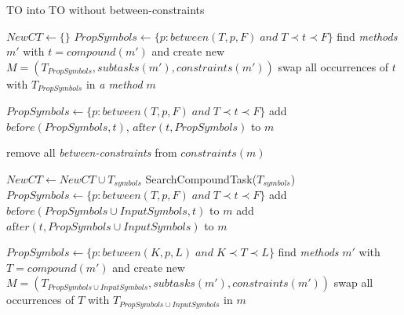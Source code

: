 \begin{algorithm}
    \caption{TO into TO without between-constraints}\label{alg04:1}
    \begin{algorithmic}[1]
            \State $NewCT \gets \{\}$ 
                    \State $PropSymbols \gets \{p: between(T, p, F) \; and \; T \prec t \prec F \}$
                        \State find \emph{methods} $m'$ with $t = compound(m')$ and create new $M=(T_{PropSymbols}, subtasks(m'), constraints(m'))$
                    \EndIf
                    \State swap all occurrences of $t$ with $T_{PropSymbols}$ in \emph{a method} $m$
                \EndFor

                    \State $PropSymbols \gets \{p: between(T, p, F) \; and \; T \prec t \prec F \}$
                    \State {}
                    \State add $be\text{f}ore(PropSymbols, t)$, $a\text{f}ter(t, PropSymbols)$ to $m$
                \EndFor
                
                \State remove all \emph{between-constraints} from $constraints(m)$

                    \State $NewCT \gets NewCT \cup T_{symbols}$
                    \State SearchCompoundTask($T_{symbols}$)
                \EndFor
            \EndWhile
        \EndProcedure
                    \State $PropSymbols \gets \{p: between(T, p, F) \; and \; T \prec t \prec F \}$
                    \State add $be\text{f}ore(PropSymbols \cup InputSymbols, t)$ to $m$
                    \State add $a\text{f}ter(t, PropSymbols \cup InputSymbols)$ to $m$
                \EndFor

                    \State $PropSymbols \gets \{p: between(K, p, L) \; and \; K \prec T \prec L \}$
                        \State find \emph{methods} $m'$ with $T = compound(m')$ and create new $M=(T_{PropSymbols \cup InputSymbols}, subtasks(m'), constraints(m'))$
                    \EndIf
                    \State swap all occurrences of $T$ with $T_{PropSymbols \cup InputSymbols}$ in $m$
                \EndFor


\end{algorithmic}
\end{algorithm}
